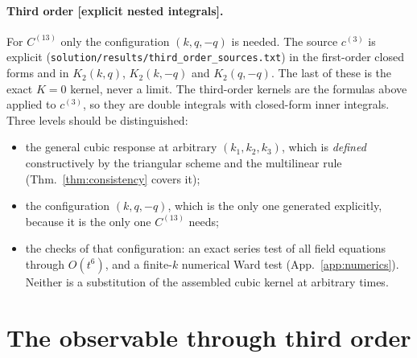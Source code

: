 \documentclass[11pt]{article}
\theoremstyle{definition}
\theoremstyle{remark}
\newcommand{\st}[1]{\textsf{[#1]}}
\newcommand{\code}[1]{\texttt{#1}}
\begin{document}
\paragraph{Third order \st{explicit nested integrals}.} For $C^{(13)}$ only the configuration
$(k,q,-q)$ is needed. The source $c^{(3)}$ is explicit
(\code{solution/results/third\_order\_sources.txt}) in the first-order closed forms and in
$K_2(k,q)$, $K_2(k,-q)$ and $K_2(q,-q)$. The last of these is the exact $K=0$ kernel, never a
limit. The third-order kernels are the formulas above applied to $c^{(3)}$, so they are double
integrals with closed-form inner integrals. Three levels should be distinguished:
\begin{itemize}
\item the general cubic response at arbitrary $(k_1,k_2,k_3)$, which is \emph{defined}
  constructively by the triangular scheme and the multilinear rule (Thm.~\ref{thm:consistency}
  covers it);
\item the configuration $(k,q,-q)$, which is the only one generated explicitly, because it is
  the only one $C^{(13)}$ needs;
\item the checks of that configuration: an exact series test of all field equations
  through $O(t^6)$, and a finite-$k$ numerical Ward test (App.~\ref{app:numerics}). Neither is
  a substitution of the assembled cubic kernel at arbitrary times.
\end{itemize}



\section{The observable through third order}\label{sec:obs}
\end{document}
